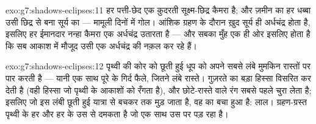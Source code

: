 \begin{solution}{exo:g7:shadows-eclipses:11}
हर पत्ती-छेद एक क़ुदरती सूक्ष्म-छिद्र कैमरा है; और ज़मीन का हर धब्बा
उसी छिद्र से बना सूर्य का  --- मामूली दिनों में गोल। आंशिक
ग्रहण के दौरान ख़ुद सूर्य ही अर्धचंद्र होता है, इसलिए हर ईमानदार नन्हा
कैमरा एक अर्धचंद्र उतारता है --- और सबका मुँह एक ही ओर इसलिए होता है
कि सब आकाश में मौजूद उसी एक अर्धचंद्र की नक़ल कर रहे हैं।
\end{solution}

\begin{solution}{exo:g7:shadows-eclipses:12}
पृथ्वी की कोर को छूती हुई धूप  को अपने सबसे लंबे मुमकिन
रास्तों पर पार करती है --- यानी एक साथ पूरे  के गिर्द फैले,
 जितने लंबे रास्ते।  गुज़रते  का बड़ा हिस्सा विसरित
कर देती है (वही हिस्सा जो पृथ्वी के आकाशों को रँगता है), और 
छोटे-रास्ते वाले रंग सबसे पहले चुरा लेता है; इसलिए जो  इस लंबी
छूती हुई यात्रा से बचकर  तक मुड़ जाता है, वह  का बचा
हुआ  है: लाल। ग्रहण-ग्रस्त  पृथ्वी के हर  और हर
 के उस  से दमकता है जो एक साथ उस पर पड़ रहा है।
\end{solution}

